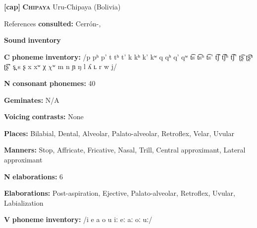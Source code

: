 \documentclass[output=paper]{langsci/langscibook}
\begin{document}
\begin{styleBody}
\textbf{[cap]}   \textbf{\textsc{Chipaya}}  Uru-Chipaya (Bolivia)
\end{styleBody}

\begin{styleBody}
References \textbf{consulted:} Cerrón-\citet{Palomino2006}, \citet{Olson1967}
\end{styleBody}

\begin{styleBody}
\textbf{Sound} \textbf{inventory}
\end{styleBody}

\begin{styleBody}
\textbf{C} \textbf{phoneme} \textbf{inventory:} /p pʰ p’ t tʰ t’ k kʰ k’ kʷ q qʰ q’ qʷ t͡s t͡sʰ t͡s’ t͡ʃ t͡ʃʰ t͡ʃ’ ʈ͡ʂ ʈ͡ʂʰ ʈ͡ʂ’ s̪ s ʂ x xʷ χ $\chi ʷ$ m n ɲ ŋ l ʎ ʟ r w j/
\end{styleBody}

\begin{styleBody}
\textbf{N} \textbf{consonant} \textbf{phonemes:} 40
\end{styleBody}

\begin{styleBody}
\textbf{Geminates:} N/A
\end{styleBody}

\begin{styleBody}
\textbf{Voicing} \textbf{contrasts:} None
\end{styleBody}

\begin{styleBody}
\textbf{Places:} Bilabial, Dental, Alveolar, Palato-alveolar, Retroflex, Velar, Uvular
\end{styleBody}

\begin{styleBody}
\textbf{Manners:} Stop, Affricate, Fricative, Nasal, Trill, Central approximant, Lateral approximant
\end{styleBody}

\begin{styleBody}
\textbf{N} \textbf{elaborations:} 6
\end{styleBody}

\begin{styleBody}
\textbf{Elaborations:} Post-aspiration, Ejective, Palato-alveolar, Retroflex, Uvular, Labialization
\end{styleBody}

\begin{styleBody}
\textbf{V} \textbf{phoneme} \textbf{inventory:} /i e a o u iː eː aː oː uː/
\end{styleBody}
\end{document}
